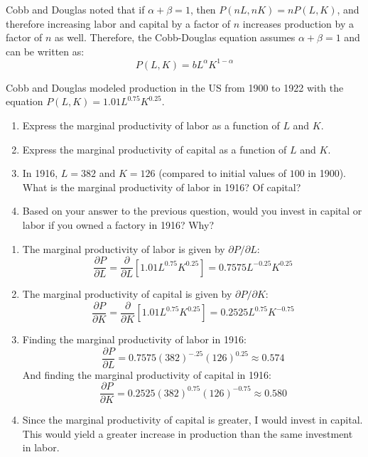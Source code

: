 Cobb and Douglas noted that if $\alpha + \beta = 1$, then $P(nL, nK) = nP(L, 
K)$, and therefore increasing labor and capital by a factor of $n$ increases 
production by a factor of $n$ as well. Therefore, the Cobb-Douglas equation 
assumes $\alpha + \beta = 1$ and can be written as:
$$P(L, K) = bL^{\alpha}K^{1 - \alpha}$$

\begin{Exercise}[title = {Cobb-Douglas Production Model}, label = cobb]
Cobb and Douglas modeled production in the US from 1900 to 1922 with the 
equation $P(L, K) = 1.01L^{0.75} K^{0.25}$. 
\begin{enumerate}
\item Express the marginal productivity of labor as a function of $L$ and $K$.
\item Express the marginal productivity of capital as a function of $L$ and $K$.
\item In 1916, $L = 382$ and $K = 126$ (compared to initial values of $100$ in 
1900). What is the marginal productivity of labor in 1916? Of capital?
\item Based on your answer to the previous question, would you invest in 
capital or labor if you owned a factory in 1916? Why?
\end{enumerate}
\end{Exercise}

\begin{Answer}[ref = cobb]
\begin{enumerate}
    \item The marginal productivity of labor is given by $\partial P / \partial L$:
    $$\frac{\partial P}{\partial L} = \frac{\partial}{\partial L} \left[ 1.01 
    L^{0.75} K^{0.25} \right] = 0.7575 L^{-0.25} K^{0.25}$$
    \item The marginal productivity of capital is given by $\partial P / \partial 
    K$:
    $$\frac{\partial P}{\partial K} = \frac{\partial}{\partial K} \left[ 1.01 
    L^{0.75} K^{0.25} \right] = 0.2525 L^{0.75} K^{-0.75}$$
    \item Finding the marginal productivity of labor in 1916:
    $$\frac{\partial P}{\partial L} = 0.7575 \left( 382 \right)^{-.25} \left( 
    126 \right)^{0.25} \approx 0.574$$
    And finding the marginal productivity of capital in 1916:
    $$\frac{\partial P}{\partial K} = 0.2525 \left( 382 \right)^{0.75} \left( 
    126 \right)^{-0.75} \approx 0.580$$
    \item Since the marginal productivity of capital is greater, I would invest in 
    capital. This would yield a greater increase in production than the same 
    investment in labor. 
\end{enumerate}
\end{Answer}
